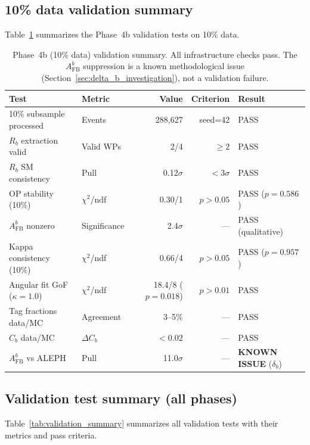 \documentclass[11pt,a4paper]{article}
\begin{document}
\subsection{10\% data validation summary}
\label{sec:xcheck_10pct_summary}

Table~\ref{tab:validation_10pct} summarizes the Phase~4b validation tests on 10\% data.

\begin{table}[htbp]
\centering
\caption{Phase~4b (10\% data) validation summary. All infrastructure checks pass.
The $A_\mathrm{FB}^b$ suppression is a known methodological issue
(Section~\ref{sec:delta_b_investigation}), not a validation failure.}
\label{tab:validation_10pct}
\small
\begin{tabular}{llrrl}
\toprule
Test & Metric & Value & Criterion & Result \\
\midrule
10\% subsample processed & Events & 288,627 & seed=42 & PASS \\
$R_b$ extraction valid & Valid WPs & 2/4 & $\geq 2$ & PASS \\
$R_b$ SM consistency & Pull & 0.12$\sigma$ & $< 3\sigma$ & PASS \\
OP stability (10\%) & $\chi^2$/ndf & 0.30/1 & $p > 0.05$ & PASS ($p = 0.586$) \\
$A_\mathrm{FB}^b$ nonzero & Significance & 2.4$\sigma$ & --- & PASS (qualitative) \\
Kappa consistency (10\%) & $\chi^2$/ndf & 0.66/4 & $p > 0.05$ & PASS ($p = 0.957$) \\
Angular fit GoF ($\kappa=1.0$) & $\chi^2$/ndf & 18.4/8 ($p = 0.018$) & $p > 0.01$ & PASS \\
Tag fractions data/MC & Agreement & 3--5\% & --- & PASS \\
$C_b$ data/MC & $\Delta C_b$ & $< 0.02$ & --- & PASS \\
$A_\mathrm{FB}^b$ vs ALEPH & Pull & 11.0$\sigma$ & --- & \textbf{KNOWN ISSUE} ($\delta_b$) \\
\bottomrule
\end{tabular}
\end{table}

\subsection{Validation test summary (all phases)}
\label{sec:validation_summary}

Table~\ref{tab:validation_summary} summarizes all validation tests with their metrics
and pass criteria.
\end{document}
